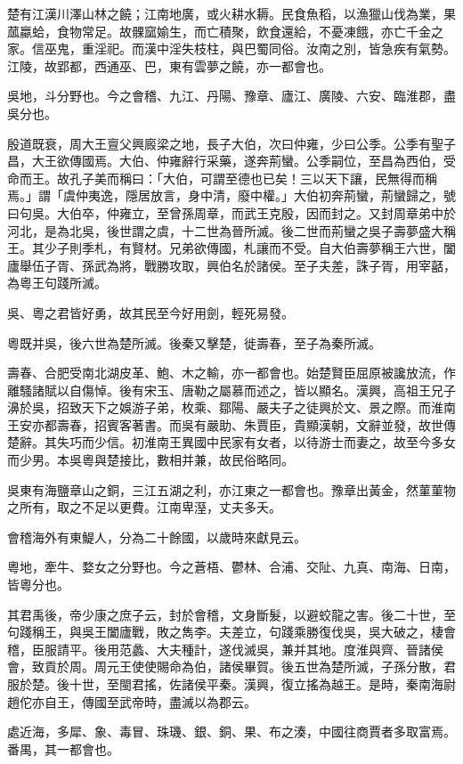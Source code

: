 \begin{pinyinscope}
楚有江漢川澤山林之饒；江南地廣，或火耕水耨。民食魚稻，以漁獵山伐為業，果蓏蠃蛤，食物常足。故髁窳媮生，而亡積聚，飲食還給，不憂凍餓，亦亡千金之家。信巫鬼，重淫祀。而漢中淫失枝柱，與巴蜀同俗。汝南之別，皆急疾有氣勢。江陵，故郢都，西通巫、巴，東有雲夢之饒，亦一都會也。

吳地，斗分野也。今之會稽、九江、丹陽、豫章、廬江、廣陵、六安、臨淮郡，盡吳分也。

殷道既衰，周大王亶父興廄梁之地，長子大伯，次曰仲雍，少曰公季。公季有聖子昌，大王欲傳國焉。大伯、仲雍辭行采藥，遂奔荊蠻。公季嗣位，至昌為西伯，受命而王。故孔子美而稱曰：「大伯，可謂至德也已矣！三以天下讓，民無得而稱焉。」謂「虞仲夷逸，隱居放言，身中清，廢中權。」大伯初奔荊蠻，荊蠻歸之，號曰句吳。大伯卒，仲雍立，至曾孫周章，而武王克殷，因而封之。又封周章弟中於河北，是為北吳，後世謂之虞，十二世為晉所滅。後二世而荊蠻之吳子壽夢盛大稱王。其少子則季札，有賢材。兄弟欲傳國，札讓而不受。自大伯壽夢稱王六世，闔廬舉伍子胥、孫武為將，戰勝攻取，興伯名於諸侯。至子夫差，誅子胥，用宰嚭，為粵王句踐所滅。

吳、粵之君皆好勇，故其民至今好用劍，輕死易發。

粵既并吳，後六世為楚所滅。後秦又擊楚，徙壽春，至子為秦所滅。

壽春、合肥受南北湖皮革、鮑、木之輸，亦一都會也。始楚賢臣屈原被讒放流，作離騷諸賦以自傷悼。後有宋玉、唐勒之屬慕而述之，皆以顯名。漢興，高祖王兄子濞於吳，招致天下之娛游子弟，枚乘、鄒陽、嚴夫子之徒興於文、景之際。而淮南王安亦都壽春，招賓客著書。而吳有嚴助、朱賈臣，貴顯漢朝，文辭並發，故世傳楚辭。其失巧而少信。初淮南王異國中民家有女者，以待游士而妻之，故至今多女而少男。本吳粵與楚接比，數相并兼，故民俗略同。

吳東有海鹽章山之銅，三江五湖之利，亦江東之一都會也。豫章出黃金，然菫菫物之所有，取之不足以更費。江南卑溼，丈夫多夭。

會稽海外有東鯷人，分為二十餘國，以歲時來獻見云。

粵地，牽牛、婺女之分野也。今之蒼梧、鬱林、合浦、交阯、九真、南海、日南，皆粵分也。

其君禹後，帝少康之庶子云，封於會稽，文身斷髮，以避蛟龍之害。後二十世，至句踐稱王，與吳王闔廬戰，敗之雋李。夫差立，句踐乘勝復伐吳，吳大破之，棲會稽，臣服請平。後用范蠡、大夫種計，遂伐滅吳，兼并其地。度淮與齊、晉諸侯會，致貢於周。周元王使使賜命為伯，諸侯畢賀。後五世為楚所滅，子孫分散，君服於楚。後十世，至閩君搖，佐諸侯平秦。漢興，復立搖為越王。是時，秦南海尉趙佗亦自王，傳國至武帝時，盡滅以為郡云。

處近海，多犀、象、毒冒、珠璣、銀、銅、果、布之湊，中國往商賈者多取富焉。番禺，其一都會也。


\end{pinyinscope}
